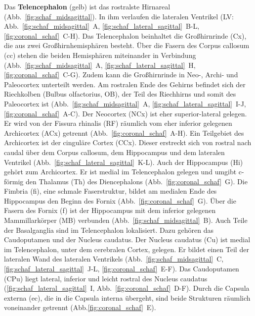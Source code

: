 \documentclass[12pt,a4paper,pdftex]{article}
\begin{document}
Das \textbf{Telencephalon} (gelb) ist das rostralste Hirnareal (Abb.~\ref{fig:schaf_midsagittal}). In ihm verlaufen die lateralen Ventrikel (LV: Abb.~\ref{fig:schaf_midsagittal}~A, \ref{fig:schaf_lateral_sagittal}~B-L, \ref{fig:coronal_schaf}~C-H). Das Telencephalon beinhaltet die Großhirnrinde (Cx), die aus zwei Großhirnhemisphären besteht. Über die Fasern des Corpus callosum (cc) stehen die beiden Hemisphären miteinander in Verbindung (Abb.~\ref{fig:schaf_midsagittal}~A, \ref{fig:schaf_lateral_sagittal}~H, \ref{fig:coronal_schaf}~C-G). Zudem kann die Großhirnrinde in Neo-, Archi- und Paleocortex unterteilt werden. Am rostralen Ende des Gehirns befindet sich der Riechkolben (Bulbus olfactorius, OB), der Teil des Riechhirns und somit des Paleocortex ist (Abb.~\ref{fig:schaf_midsagittal}~A, \ref{fig:schaf_lateral_sagittal}~I-J,
\ref{fig:coronal_schaf}~A-C). Der Neocortex (NCx) ist eher superior-lateral gelegen. Er wird von der Fissura rhinalis (RF) räumlich vom eher inferior gelegenen Archicortex (ACx) getrennt (Abb.~\ref{fig:coronal_schaf}~A-H). Ein Teilgebiet des Archicortex ist der cinguläre Cortex (CCx). Dieser erstreckt sich von rostral nach caudal über dem Corpus callosum, dem Hippocampus und dem lateralen Ventrikel (Abb.~\ref{fig:schaf_lateral_sagittal}~K-L). Auch der Hippocampus (Hi) gehört zum Archicortex. Er ist medial im Telencephalon gelegen und umgibt c-förmig den Thalamus (Th) des Diencephalons (Abb.~\ref{fig:coronal_schaf}~G). Die Fimbria (fi), eine schmale Faserstruktur, bildet am medialen Ende des Hippocampus den Beginn des Fornix (Abb.~\ref{fig:coronal_schaf}~G). Über die Fasern des Fornix (f) ist der Hippocampus mit dem inferior gelegenen Mammillarkörper (MB) verbunden (Abb.~\ref{fig:schaf_midsagittal}~B). Auch Teile der Basalganglia sind im Telencephalon lokalisiert. Dazu gehören das Caudoputamen und der Nucleus caudatus. Der Nucleus caudatus (Cu) ist medial im Telencephalon, unter dem cerebralen Cortex, gelegen. Er bildet einen Teil der lateralen Wand des lateralen Ventrikels (Abb.~\ref{fig:schaf_midsagittal}~C, \ref{fig:schaf_lateral_sagittal}~J-L, \ref{fig:coronal_schaf}~E-F). Das Caudoputamen (CPu) liegt lateral, inferior und leicht rostral des Nucleus caudatus (\ref{fig:schaf_lateral_sagittal}~I, Abb.~\ref{fig:coronal_schaf}~D-F). Durch die Capsula externa (ec), die in die Capsula interna übergeht, sind beide Strukturen räumlich voneinander getrennt (Abb.\ref{fig:coronal_schaf}~E).
\end{document}
